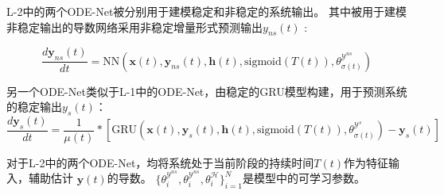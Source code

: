 L-2中的两个ODE-Net被分别用于建模稳定和非稳定的系统输出。
其中被用于建模非稳定输出的导数网络采用非稳定增量形式预测输出$y_{ns}(t)$ :

\begin{equation}
    \label{equ:dyns}
    \frac{d \boldsymbol{y}_{ns}(t)}{dt} = \text{NN}(\boldsymbol{x}(t),\boldsymbol{y}_{ns}(t), \boldsymbol{h}(t), \text{sigmoid}(T(t)), \theta^{\mathcal{Y}^{ns}}_{\sigma(t)})
\end{equation}

另一个ODE-Net类似于L-1中的ODE-Net，由稳定的GRU模型构建，用于预测系统的稳定输出$y_s(t)$：
\begin{equation}
    \label{equ:dys}
    \frac{d \boldsymbol{y}_{s}(t)}{dt} = \frac{1}{\mu(t)}*\left[\text{GRU}(\boldsymbol{x}(t),\boldsymbol{y}_s(t), \boldsymbol{h}(t), \text{sigmoid}(T(t)), \theta^{\mathcal{Y}^{s}}_{\sigma(t)}) - \boldsymbol{y}_s(t)\right]
\end{equation}

对于L-2中的两个ODE-Net，均将系统处于当前阶段的持续时间$T(t)$作为特征输入，辅助估计 $\boldsymbol{y}(t)$的导数。
$\{\theta_i^{\mathcal{Y}^{ns}},\theta_i^{\mathcal{Y}^{ns}},\theta_i^{\mathcal{H}}\}_{i=1}^N$是模型中的可学习参数。

